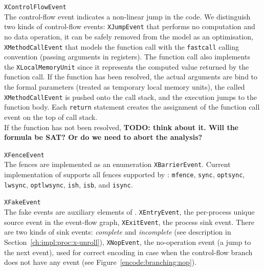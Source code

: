 \begin{outline}
  \1 \texttt{XControlFlowEvent} \\
    The control-flow event indicates a non-linear jump in the code. We distinguish two kinds of control-flow events: 
      \2 \texttt{XJumpEvent} that performs no computation and no data operation, it can be safely removed from the model as an optimisation,
      \2 \texttt{XMethodCallEvent} that models the function call with the \texttt{fastcall} calling convention (passing arguments in registers).
      The function call also implements the \texttt{XLocalMemoryUnit} since it represents the computed value returned by the function call.
      If the function has been resolved, the actual arguments are bind to the formal parameters (treated as temporary local memory units), the called \texttt{XMethodCallEvent} is pushed onto the call stack, and the execution jumps to the function body.
      Each \texttt{return} statement creates the assignment of the function call event on the top of call stack.
      \\
      If the function has not been resolved, \textbf{TODO: think about it. Will the formula be SAT? Or do we need to abort the analysis?}

  \1 \texttt{XFenceEvent} \\
    The fences are implemented as an enumeration \texttt{XBarrierEvent}.
    Current implementation of \porthos[2] supports all fences supported by \porthos{}: 
    \texttt{mfence}, %
    \texttt{sync}, \texttt{optsync}, \texttt{lwsync}, \texttt{optlwsync}, \texttt{ish}, \texttt{isb}, and \texttt{isync}.%
    
  \1 \texttt{XFakeEvent} \\
    The fake events are auxiliary elements of \xgraph{}.
    \2 \texttt{XEntryEvent}, the per-process unique source event in the event-flow graph,
    \2 \texttt{XExitEvent}, the process sink event. There are two kinds of sink events: \textit{complete} and \textit{incomplete} (see description in Section~\ref{ch:impl:proc:x-unroll}),
    \2 \texttt{XNopEvent}, the no-operation event (a jump to the next event), used for correct encoding in case when the control-flow branch does not have any event (see Figure~\ref{encode:branching:nop}).
\end{outline}


